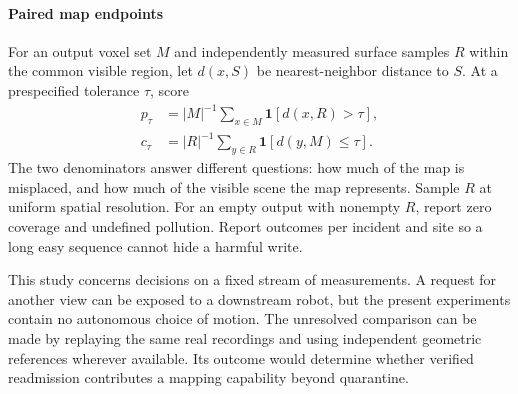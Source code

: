 \documentclass[conference]{IEEEtran}
\begin{document}
\paragraph{Paired map endpoints}
For an output voxel set $M$ and independently measured surface samples $R$ within the common visible region, let $d(x,S)$ be nearest-neighbor distance to $S$. At a prespecified tolerance $\tau$, score
\begin{align}
 p_\tau &= |M|^{-1}\textstyle\sum_{x\in M} \mathbf{1}[d(x,R)>\tau],\\
 c_\tau &= |R|^{-1}\textstyle\sum_{y\in R} \mathbf{1}[d(y,M)\leq\tau].
\end{align}
The two denominators answer different questions: how much of the map is misplaced, and how much of the visible scene the map represents. Sample $R$ at uniform spatial resolution. For an empty output with nonempty $R$, report zero coverage and undefined pollution. Report outcomes per incident and site so a long easy sequence cannot hide a harmful write.

This study concerns decisions on a fixed stream of measurements. A request for another view can be exposed to a downstream robot, but the present experiments contain no autonomous choice of motion. The unresolved comparison can be made by replaying the same real recordings and using independent geometric references wherever available. Its outcome would determine whether verified readmission contributes a mapping capability beyond quarantine.
\clearpage


\end{document}

